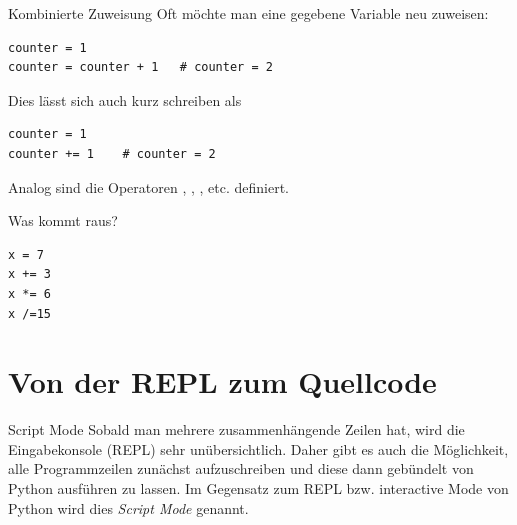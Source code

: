 \begin{fragile}[]
\begin{block}{Kombinierte Zuweisung}
\vspace{2pt}
Oft möchte man eine gegebene Variable neu zuweisen: 
\begin{verbatim}
counter = 1
counter = counter + 1 	# counter = 2
\end{verbatim}
\pause
Dies lässt sich auch kurz schreiben als 
\begin{verbatim}
counter = 1
counter += 1 	# counter = 2
\end{verbatim}
\pause
Analog sind die Operatoren \py{-=}, \py{*=}, \py{/=}, etc. definiert. 
\end{block}
\end{fragile}

\begin{fragile}[Übung]
\begin{block}{Was kommt raus?}
\vspace{2pt}
\begin{verbatim}
x = 7 
x += 3
x *= 6
x /=15
\end{verbatim}

\end{block}
\end{fragile}



\section{Von der REPL zum Quellcode}
\begin{frame}
\begin{block}{Script Mode}
	\vspace{2pt}
	Sobald man mehrere zusammenhängende Zeilen hat, wird die Eingabekonsole (REPL) sehr unübersichtlich. Daher gibt es auch die Möglichkeit, alle Programmzeilen zunächst aufzuschreiben und diese dann gebündelt von Python ausführen zu lassen. Im Gegensatz zum REPL bzw. interactive Mode von Python wird dies \emph{Script Mode} genannt.    
\end{block}
\end{frame}

